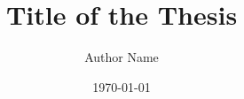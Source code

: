 



\frontmatter
\title{Title of the Thesis}
\author{Author Name}
\date{\today}
\maketitle

\tableofcontents
\listoffigures
\listoftables

\mainmatter











\printbibliography[heading=bibintoc]

\backmatter

